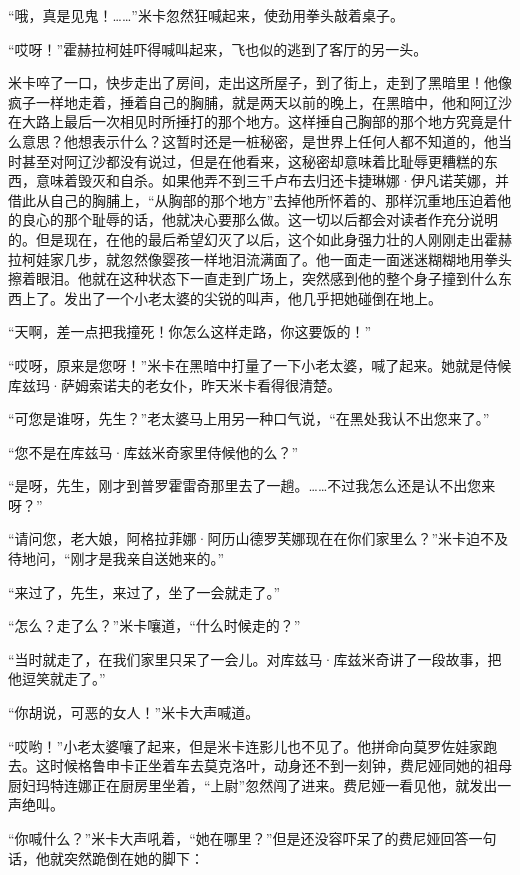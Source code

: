 \par “哦，真是见鬼！……”米卡忽然狂喊起来，使劲用拳头敲着桌子。
\par “哎呀！”霍赫拉柯娃吓得喊叫起来，飞也似的逃到了客厅的另一头。
\par 米卡啐了一口，快步走出了房间，走出这所屋子，到了街上，走到了黑暗里！他像疯子一样地走着，捶着自己的胸脯，就是两天以前的晚上，在黑暗中，他和阿辽沙在大路上最后一次相见时所捶打的那个地方。这样捶自己胸部的那个地方究竟是什么意思？他想表示什么？这暂时还是一桩秘密，是世界上任何人都不知道的，他当时甚至对阿辽沙都没有说过，但是在他看来，这秘密却意味着比耻辱更糟糕的东西，意味着毁灭和自杀。如果他弄不到三千卢布去归还卡捷琳娜·伊凡诺芙娜，并借此从自己的胸脯上，“从胸部的那个地方”去掉他所怀着的、那样沉重地压迫着他的良心的那个耻辱的话，他就决心要那么做。这一切以后都会对读者作充分说明的。但是现在，在他的最后希望幻灭了以后，这个如此身强力壮的人刚刚走出霍赫拉柯娃家几步，就忽然像婴孩一样地泪流满面了。他一面走一面迷迷糊糊地用拳头擦着眼泪。他就在这种状态下一直走到广场上，突然感到他的整个身子撞到什么东西上了。发出了一个小老太婆的尖锐的叫声，他几乎把她碰倒在地上。
\par “天啊，差一点把我撞死！你怎么这样走路，你这要饭的！”
\par “哎呀，原来是您呀！”米卡在黑暗中打量了一下小老太婆，喊了起来。她就是侍候库兹玛·萨姆索诺夫的老女仆，昨天米卡看得很清楚。
\par “可您是谁呀，先生？”老太婆马上用另一种口气说，“在黑处我认不出您来了。”
\par “您不是在库兹马·库兹米奇家里侍候他的么？”
\par “是呀，先生，刚才到普罗霍雷奇那里去了一趟。……不过我怎么还是认不出您来呀？”
\par “请问您，老大娘，阿格拉菲娜·阿历山德罗芙娜现在在你们家里么？”米卡迫不及待地问，“刚才是我亲自送她来的。”
\par “来过了，先生，来过了，坐了一会就走了。”
\par “怎么？走了么？”米卡嚷道，“什么时候走的？”
\par “当时就走了，在我们家里只呆了一会儿。对库兹马·库兹米奇讲了一段故事，把他逗笑就走了。”
\par “你胡说，可恶的女人！”米卡大声喊道。
\par “哎哟！”小老太婆嚷了起来，但是米卡连影儿也不见了。他拼命向莫罗佐娃家跑去。这时候格鲁申卡正坐着车去莫克洛叶，动身还不到一刻钟，费尼娅同她的祖母厨妇玛特连娜正在厨房里坐着，“上尉”忽然闯了进来。费尼娅一看见他，就发出一声绝叫。
\par “你喊什么？”米卡大声吼着，“她在哪里？”但是还没容吓呆了的费尼娅回答一句话，他就突然跪倒在她的脚下：
